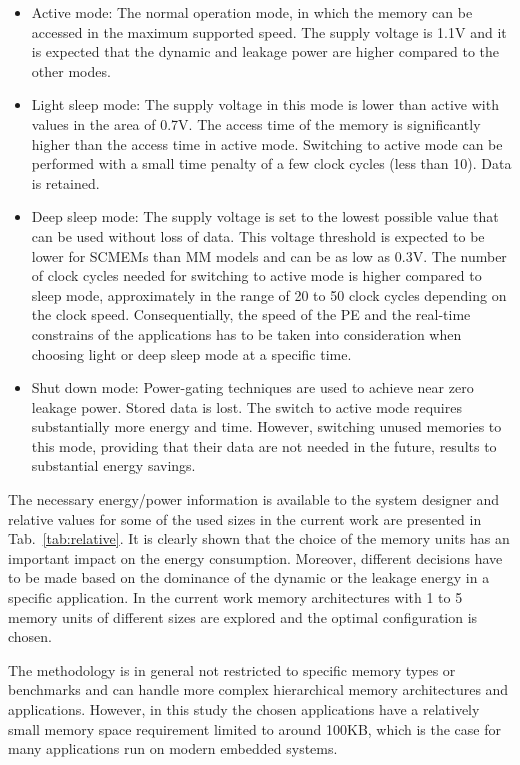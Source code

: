 \documentclass{acm_proc_article-sp}
\begin{document}
\begin{itemize}
\item Active mode: The normal operation mode, in which the memory can be accessed in the maximum supported speed. The supply voltage is 1.1V and it is expected that the dynamic and leakage power are higher compared to the other modes.
\item Light sleep mode: The supply voltage in this mode is lower than active with values in the area of 0.7V. The access time of the memory is significantly higher than the access time in active mode. Switching to active mode can be performed with a small time penalty of a few clock cycles (less than 10). Data is retained.  
\item Deep sleep mode: The supply voltage is set to the lowest possible value that can be used without loss of data. This voltage threshold is expected to be lower for SCMEMs than MM models and can be as low as 0.3V. The number of clock cycles needed for switching to active mode is higher compared to sleep mode, approximately in the range of 20 to 50 clock cycles depending on the clock speed. Consequentially, the speed of the PE and the real-time constrains of the applications has to be taken into consideration when choosing light or deep sleep mode at a specific time.  
\item Shut down mode: Power-gating techniques are used to achieve near zero leakage power. Stored data is lost. The switch to active mode requires substantially more energy and time. However, switching unused memories to this mode, providing that their data are not needed in the future, results to substantial energy savings.
\end{itemize}  

The necessary energy/power information is available to the system designer and relative values for some of the used sizes in the current work are presented in Tab.~\ref{tab:relative}. It is clearly shown that the choice of the memory units has an important impact on the energy consumption. Moreover, different decisions have to be made based on the dominance of the dynamic or the leakage energy in a specific application. In the current work memory architectures with 1 to 5 memory units  of different sizes are explored and the optimal configuration is chosen.

The methodology is in general not restricted to specific memory types or benchmarks and can handle more complex hierarchical memory architectures and applications. However, in this study the chosen applications have a relatively small memory space requirement limited to around 100KB, which is the case for many applications run on modern embedded systems. 
\end{document}
